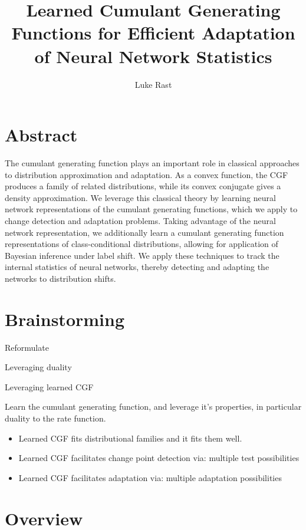 \documentclass[11pt]{article}      %
\begin{document}
\title{Learned Cumulant Generating Functions for Efficient Adaptation of Neural Network Statistics}
\author{Luke Rast}
\maketitle

\doublespacing
\linenumbers


\section{Abstract}

The cumulant generating function plays an important role in classical approaches to distribution approximation and adaptation.
As a convex function, the CGF produces a family of related distributions, while its convex conjugate gives a density approximation.
We leverage this classical theory by learning neural network representations of the cumulant generating functions, which we apply to change detection and adaptation problems.
Taking advantage of the neural network representation, we additionally learn a cumulant generating function representations of class-conditional distributions, allowing for application of Bayesian inference under label shift.
We apply these techniques to track the internal statistics of neural networks, thereby detecting and adapting the networks to distribution shifts.



\section{Brainstorming}
Reformulate

Leveraging duality 

Leveraging learned CGF

Learn the cumulant generating function, and leverage it's properties, in particular duality to the rate function.

\begin{itemize}
  \item Learned CGF fits distributional families and it fits them well.
  \item Learned CGF facilitates change point detection via: multiple test possibilities
  \item Learned CGF facilitates adaptation via: multiple adaptation possibilities
\end{itemize}

\section{Overview}
\end{document}
